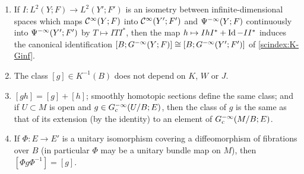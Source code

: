 \begin{lemma}\label{scindex:lem:class}
  \begin{enumerate}[label=(\roman*)]
  \item If $I:L^2(Y;F)\to L^2(Y';F')$ is an isometry between infinite-dimensional
  spaces which maps $\mathcal{C}^\infty(Y;F)$ into
    $\mathcal{C}^\infty(Y';F')$ and $\Psi^{-\infty}(Y;F)$ continuously into
    $\Psi^{-\infty}(Y';F')$ by $T\mapsto ITI^*$, then the map
    $h\mapsto IhI^*+\operatorname{Id}-II^*$ induces the canonical identification
    $[B;G^{-\infty}(Y;F)]\cong[B;G^{-\infty}(Y';F')]$ of \ref{scindex:K-Ginf}.
  \item The class $[g]\in K^{-1}(B)$ does not depend on $K$, $W$ or $J$.
  \item $[gh]=[g]+[h]$; smoothly homotopic sections define the same class; and if
    $U\subset M$ is open and $g\in G^{-\infty}_{\mathrm c}(U/B;E)$, then the class of $g$
    is the same as that of its extension (by the identity) to an element of
    $G^{-\infty}_{\mathrm c}(M/B;E)$.
  \item If $\Phi:E\to E'$ is a unitary isomorphism covering a diffeomorphism of
    fibrations over $B$ (in particular $\Phi$ may be a unitary bundle map on
    $M$), then $[\Phi g\Phi^{-1}]=[g]$.
  \end{enumerate}
\end{lemma}
